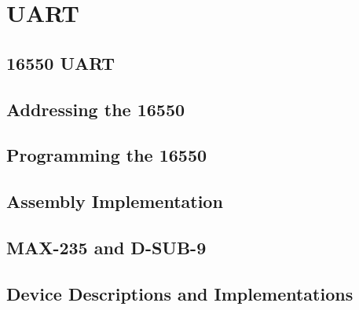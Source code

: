 \section{UART}

    \subsection{16550 UART}

    \subsection{Addressing the 16550}

    \subsection{Programming the 16550}

    \subsection{Assembly Implementation}

    \subsection{MAX-235 and D-SUB-9}

    \subsection{Device Descriptions and Implementations}
